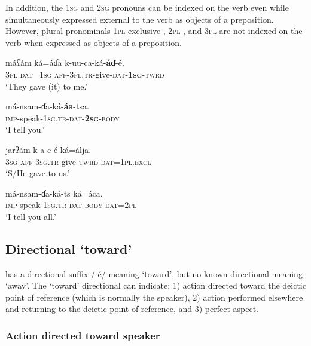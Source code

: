 \documentclass[output=paper]{langsci/langscibook}
\begin{document}
In addition, the \textsc{1sg}  and \textsc{2sg}  pronouns can be indexed on the verb even while simultaneously expressed external to the verb as objects of a preposition. However, plural pronominals \textsc{1pl} exclusive , 2\textsc{pl} , and 3\textsc{pl}  are not indexed on the verb when expressed as objects of a preposition.

\ea\label{ex:ahlandc:25}
\gll
máʕám  ká=áɗa  k-uu-ca-ká-\textbf{áɗ}{}-é.  \\ 
\textsc{3pl}  \textsc{dat=1sg}  \textsc{aff-3pl.tr}{}-give-\textsc{dat}{}-\textbf{1}\textbf{\textsc{sg}}\textsc{{}-twrd} \\
\glt
‘They gave (it) to me.’
\z

\ea\label{ex:ahlandc:26}
\gll
má-nsam-ɗa-ká-\textbf{áa}{}-tsa. \\
\textsc{imp}{}-speak-\textsc{1sg.tr}{}-\textsc{dat}{}-\textbf{\textsc{2sg}}{}-\textsc{body} \\ 
\glt
‘I tell you.’
\z

\ea\label{ex:ahlandc:27}
\gll
jarʔám     k-a-c-é    ká=álja.  \\ 
3\textsc{sg}  \textsc{aff-3sg.tr}{}-give-\textsc{twrd}  \textsc{dat=1pl.excl} \\
\glt
‘S/He gave to us.’
\z

\ea\label{ex:ahlandc:28}
\gll
má-nsam-ɗa-ká-ts    ká=áca. \\
\textsc{imp}{}-speak-\textsc{1sg.tr-dat-body}  \textsc{dat=2pl} \\
\glt
‘I tell you all.’
\z

\subsection{Directional ‘toward’}\label{sec:ahlandc:4.6}

 has a directional suffix /-é/ meaning ‘toward’, but no known directional meaning ‘away’. The ‘toward’ directional can indicate: 1) action directed toward the deictic point of reference (which is normally the speaker), 2) action performed elsewhere and returning to the deictic point of reference, and 3) perfect aspect.

\subsubsection{Action directed toward speaker}\label{sec:ahlandc:4.6.1}
\end{document}
